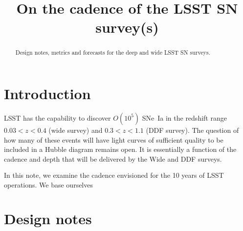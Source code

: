 \documentclass[\docopts]{\docclass}
\begin{document}
\title{ On the cadence of the LSST SN survey(s) }

\maketitlepre

\begin{abstract}

Design notes, metrics and forecasts for the deep and wide LSST SN surveys.

\end{abstract}


\maketitlepost

% 

\section{Introduction}
\label{sec:intro}

LSST has the capability to discover $O(10^5)$ SNe~Ia in the redshift
range $0.03 < z < 0.4$ (wide survey) and $0.3 < z < 1.1$ (DDF
survey). The question of how many of these events will have light
curves of sufficient quality to be included in a Hubble diagram
remains open.  It is essentially a function of the cadence and depth
that will be delivered by the Wide and DDF surveys.

In this note, we examine the cadence envisioned for the 10 years of
LSST operations.  We base ourselves







\section{Design notes}
\label{sec:design_notes}
\end{document}
